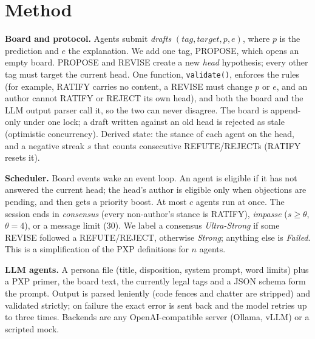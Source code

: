 \documentclass[11pt,a4paper,twocolumn]{article}
\begin{document}
\section{Method}
\textbf{Board and protocol.} Agents submit \emph{drafts} $(\mathit{tag}, \mathit{target},
p, e)$, where $p$ is the prediction and $e$ the explanation. We add one tag,
PROPOSE, which opens an empty board. PROPOSE and REVISE create a new \emph{head}
hypothesis; every other tag must target the current head. One function,
\texttt{validate()}, enforces the rules (for example, RATIFY carries no content, a REVISE
must change $p$ or $e$, and an author cannot RATIFY or REJECT its own head), and both the
board and the LLM output parser call it, so the two can never disagree. The board is
append-only under one lock; a draft written against an old head is rejected as stale
(optimistic concurrency). Derived state: the stance of each agent on the head, and a
negative streak $s$ that counts consecutive REFUTE/REJECTs (RATIFY resets it).

\textbf{Scheduler.} Board events wake an event loop. An agent is eligible if it has not
answered the current head; the head's author is eligible only when objections are
pending, and then gets a priority boost. At most $c$ agents run at once. The session
ends in \emph{consensus} (every non-author's stance is RATIFY), \emph{impasse}
($s \ge \theta$, $\theta=4$), or a message limit (30). We label a consensus
\emph{Ultra-Strong} if some REVISE followed a REFUTE/REJECT, otherwise
\emph{Strong}; anything else is \emph{Failed}. This is a simplification of the PXP
definitions for $n$ agents.

\textbf{LLM agents.} A persona file (title, disposition, system prompt, word limits)
plus a PXP primer, the board text, the currently legal tags and a JSON schema form the
prompt. Output is parsed leniently (code fences and chatter are stripped) and validated
strictly; on failure the exact error is sent back and the model retries up to three
times. Backends are any OpenAI-compatible server (Ollama, vLLM) or a scripted mock.
\end{document}
